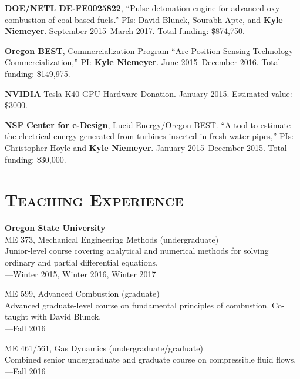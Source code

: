 \documentclass[margin,line,11pt]{res}
\newcommand*{\doi}[1]{\href{https://doi.org/#1}{\nolinkurl{https://doi.org/#1}}}
\begin{document}
\begin{resume}
\textbf{DOE\slash NETL DE-FE0025822}, ``Pulse detonation engine for advanced oxy-combustion of coal-based fuels.'' PIs: David Blunck, Sourabh Apte, and \textbf{Kyle Niemeyer}. September 2015--March 2017. Total funding: \$874,750.

\textbf{Oregon BEST}, Commercialization Program ``Arc Position Sensing Technology Commercialization,'' PI: \textbf{Kyle Niemeyer}. June 2015--December 2016. Total funding: \$149,975.

\textbf{NVIDIA} Tesla K40 GPU Hardware Donation. January 2015. Estimated value: \$3000.

\textbf{NSF Center for e-Design}, Lucid Energy\slash Oregon BEST. ``A tool to estimate the electrical energy generated from turbines inserted in fresh water pipes,'' PIs: Christopher Hoyle and \textbf{Kyle Niemeyer}. January 2015--December 2015. Total funding: \$30,000.


%
%
%

\section{\textsc{Teaching Experience}}

\textbf{Oregon State University} \\
ME 373, Mechanical Engineering Methods (undergraduate) \\
Junior-level course covering analytical and numerical methods for solving ordinary and partial differential equations. \\
---Winter 2015, Winter 2016, Winter 2017

ME 599, Advanced Combustion (graduate) \\
Advanced graduate-level course on fundamental principles of combustion. Co-taught with David Blunck.\\
---Fall 2016

ME 461\slash 561, Gas Dynamics (undergraduate\slash graduate) \\
Combined senior undergraduate and graduate course on compressible fluid flows. \\
---Fall 2016


\end{resume}
\end{document}
